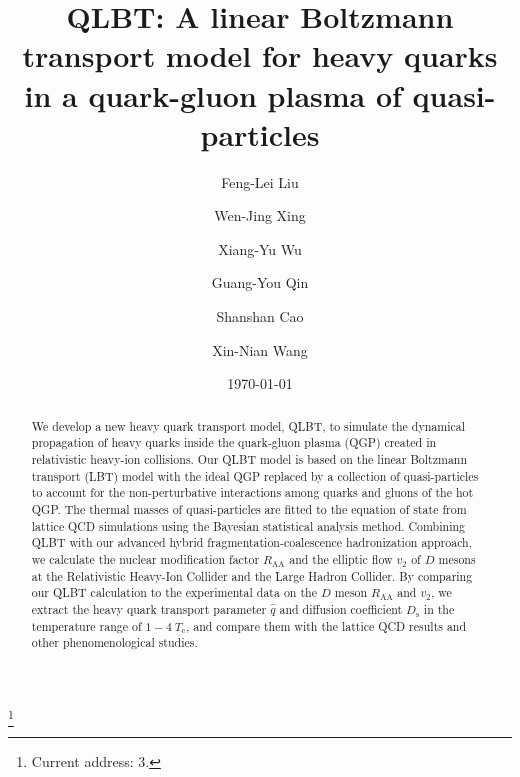 \documentclass[aps,superscriptaddress,prc,twocolumn,nofootinbib]{revtex4}
\begin{document}
\title{QLBT: A linear Boltzmann transport model for heavy quarks in a quark-gluon plasma of quasi-particles}

\author{Feng-Lei Liu}

\author{Wen-Jing Xing}

\author{Xiang-Yu Wu}

\author{Guang-You Qin}

\author{Shanshan Cao}

\author{Xin-Nian Wang}
\thanks{Current address: 3.}

\date{\today}



\begin{abstract}

We develop a new heavy quark transport model, QLBT, to simulate the dynamical propagation of heavy quarks inside the quark-gluon plasma (QGP) created in relativistic heavy-ion collisions.
Our QLBT model is based on the linear Boltzmann transport (LBT) model with the ideal QGP replaced by a collection of quasi-particles to account for the non-perturbative interactions among quarks and gluons of the hot QGP.
The thermal masses of quasi-particles are fitted to the equation of state from lattice QCD simulations using the Bayesian statistical analysis method.
Combining QLBT with our advanced hybrid fragmentation-coalescence hadronization approach, we calculate the nuclear modification factor $R_\mathrm{AA}$ and the elliptic flow $v_2$ of $D$ mesons at the Relativistic Heavy-Ion Collider and the Large Hadron Collider.
By comparing our QLBT calculation to the experimental data on the $D$ meson $R_\mathrm{AA}$ and $v_2$, we extract the heavy quark transport parameter $\hat{q}$ and diffusion coefficient $D_\mathrm{s}$ in the temperature range of $1-4~T_\mathrm{c}$, and compare them with the lattice QCD results and other phenomenological studies.


\end{abstract}
\end{document}
